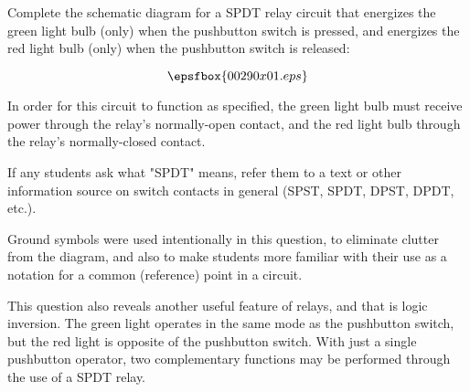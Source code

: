 

Complete the schematic diagram for a SPDT relay circuit that energizes the green light bulb (only) when the pushbutton switch is pressed, and energizes the red light bulb (only) when the pushbutton switch is released:

$$\epsfbox{00290x01.eps}$$







In order for this circuit to function as specified, the green light bulb must receive power through the relay's normally-open contact, and the red light bulb through the relay's normally-closed contact.







If any students ask what "SPDT" means, refer them to a text or other information source on switch contacts in general (SPST, SPDT, DPST, DPDT, etc.).

Ground symbols were used intentionally in this question, to eliminate clutter from the diagram, and also to make students more familiar with their use as a notation for a common (reference) point in a circuit.

This question also reveals another useful feature of relays, and that is logic inversion.  The green light operates in the same mode as the pushbutton switch, but the red light is opposite of the pushbutton switch.  With just a single pushbutton operator, two complementary functions may be performed through the use of a SPDT relay.




